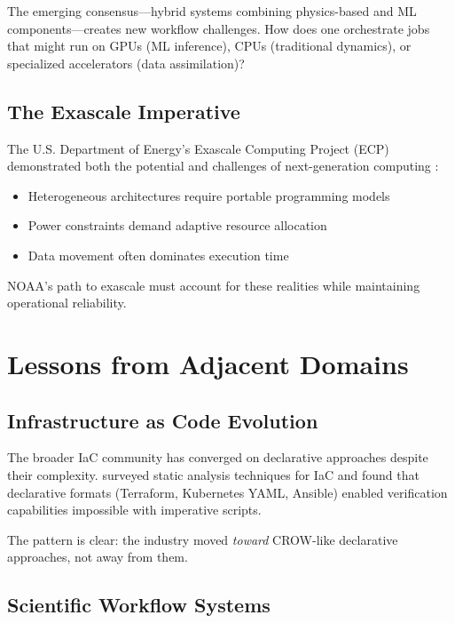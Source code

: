 \documentclass[11pt,twocolumn]{article}
\begin{document}
The emerging consensus---hybrid systems combining physics-based and ML components---creates new workflow challenges. How does one orchestrate jobs that might run on GPUs (ML inference), CPUs (traditional dynamics), or specialized accelerators (data assimilation)?

\subsection{The Exascale Imperative}

The U.S. Department of Energy's Exascale Computing Project (ECP) demonstrated both the potential and challenges of next-generation computing \cite{mniszewski2021exascale_particles}:

\begin{itemize}
    \item Heterogeneous architectures require portable programming models
    \item Power constraints demand adaptive resource allocation
    \item Data movement often dominates execution time
\end{itemize}

NOAA's path to exascale must account for these realities while maintaining operational reliability.

\section{Lessons from Adjacent Domains}

\subsection{Infrastructure as Code Evolution}

The broader IaC community has converged on declarative approaches despite their complexity. \cite{chiari2022iac_static_analysis} surveyed static analysis techniques for IaC and found that declarative formats (Terraform, Kubernetes YAML, Ansible) enabled verification capabilities impossible with imperative scripts.

The pattern is clear: the industry moved \textit{toward} CROW-like declarative approaches, not away from them.

\subsection{Scientific Workflow Systems}
\end{document}
